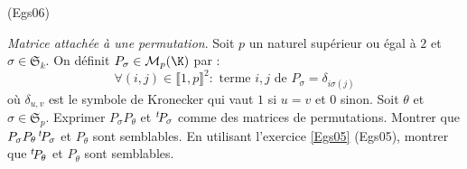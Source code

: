 \begin{tiny}(Egs06)\end{tiny} \emph{Matrice attachée à une permutation}.\newline
Soit $p$ un naturel supérieur ou égal à $2$ et $\sigma \in \mathfrak{S}_k$. On définit $P_\sigma \in \mathcal M_p(\K)$ par :
\begin{displaymath}
 \forall (i,j)\in \llbracket 1,p \rrbracket^2 :
\text{ terme $i,j$ de } P_\sigma = \delta_{i \sigma(j)}
\end{displaymath}
où $\delta_{u,v}$ est le symbole de Kronecker qui vaut $1$ si $u=v$ et $0$ sinon.\newline
Soit $\theta$ et $\sigma\in \mathfrak{S}_p$. Exprimer $P_\sigma P_{\theta}$ et $\mathstrut^t\!P_\sigma$ comme des matrices de permutations. Montrer que $P_\sigma P_{\theta}\,\mathstrut^t\!P_\sigma$ et $P_\theta$ sont semblables. En utilisant l'exercice \ref{Egs05} (Egs05), montrer que $\mathstrut^t\!P_\theta$ et $P_\theta$ sont semblables. 
